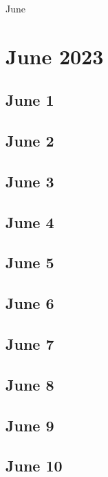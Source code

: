 June%
%
%
%

\chapter{June 2023}
\label{intro} %

\section{June 1}

\section{June 2}

\section{June 3}

\section{June 4}

\section{June 5}

\section{June 6}

\section{June 7}

\section{June 8}

\section{June 9}

\section{June 10}

